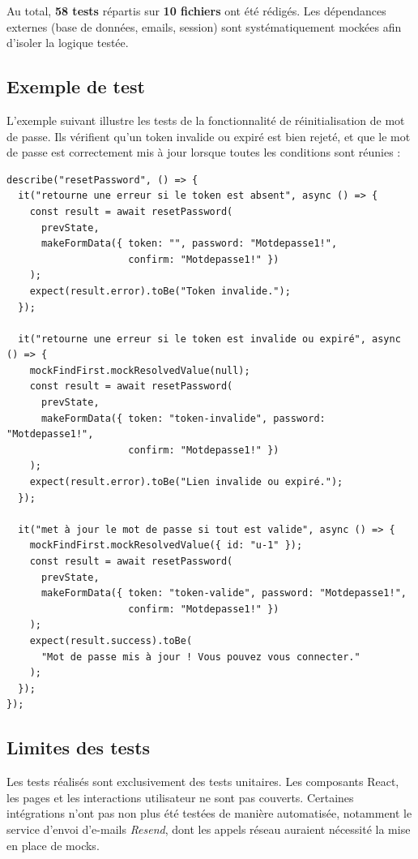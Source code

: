 \documentclass{article}
\begin{document}
Au total, \textbf{58 tests} répartis sur \textbf{10 fichiers} ont été
rédigés. Les dépendances externes (base de données, emails, session) 
sont systématiquement mockées afin d'isoler la logique testée.

\subsection{Exemple de test}

L'exemple suivant illustre les tests de la fonctionnalité de 
réinitialisation de mot de passe. Ils vérifient qu'un token invalide 
ou expiré est bien rejeté, et que le mot de passe est correctement 
mis à jour lorsque toutes les conditions sont réunies :

\begin{verbatim}
describe("resetPassword", () => {
  it("retourne une erreur si le token est absent", async () => {
    const result = await resetPassword(
      prevState,
      makeFormData({ token: "", password: "Motdepasse1!", 
                     confirm: "Motdepasse1!" })
    );
    expect(result.error).toBe("Token invalide.");
  });

  it("retourne une erreur si le token est invalide ou expiré", async () => {
    mockFindFirst.mockResolvedValue(null);
    const result = await resetPassword(
      prevState,
      makeFormData({ token: "token-invalide", password: "Motdepasse1!", 
                     confirm: "Motdepasse1!" })
    );
    expect(result.error).toBe("Lien invalide ou expiré.");
  });

  it("met à jour le mot de passe si tout est valide", async () => {
    mockFindFirst.mockResolvedValue({ id: "u-1" });
    const result = await resetPassword(
      prevState,
      makeFormData({ token: "token-valide", password: "Motdepasse1!", 
                     confirm: "Motdepasse1!" })
    );
    expect(result.success).toBe(
      "Mot de passe mis à jour ! Vous pouvez vous connecter."
    );
  });
});
\end{verbatim}

\subsection{Limites des tests}

Les tests réalisés sont exclusivement des tests unitaires. Les composants 
React, les pages et les interactions utilisateur ne sont pas couverts. 
Certaines intégrations n'ont pas non plus été testées de manière 
automatisée, notamment le service d'envoi d'e-mails \textit{Resend}, 
dont les appels réseau auraient nécessité la mise en place de mocks.
\end{document}
